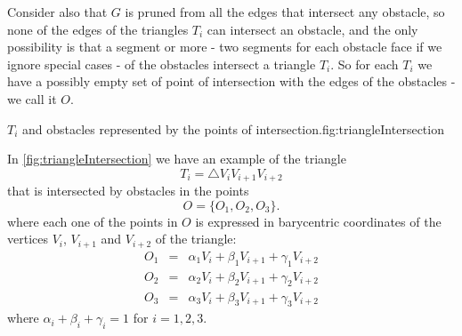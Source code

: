 \documentclass[dissertation.tex]{subfiles}
\begin{document}
Consider also that $G$ is pruned from all the edges that intersect any
obstacle, so none of the edges of the triangles $T_i$ can intersect
an obstacle, and the only possibility is that a segment or more - two
segments for each obstacle face if we ignore special cases - of the
obstacles intersect a
triangle $T_i$. So for each $T_i$ we have a possibly empty set of point
of intersection with the edges of the obstacles - we call it $O$.
\begin{myfig}{$T_i$ and obstacles
    represented by the points of intersection.}{fig:triangleIntersection}
\end{myfig}

In \cref{fig:triangleIntersection} we have an example of the triangle
\begin{equation*}
  T_i = \triangle V_iV_{i+1}V_{i+2} 
\end{equation*}
that is
intersected by obstacles in the points
\begin{equation*}
  O = \{O_1,O_2,O_3\}.
\end{equation*}
where each one of the points in $O$ is expressed in barycentric
coordinates of the vertices $V_i$, $V_{i+1}$ and $V_{i+2}$ of the
triangle:
\begin{eqnarray*}
  O_1&=&\alpha_1 V_i+\beta_1 V_{i+1}+\gamma_1 V_{i+2}\\
  O_2&=&\alpha_2 V_i+\beta_2 V_{i+1}+\gamma_2 V_{i+2}\\
  O_3&=&\alpha_3 V_i+\beta_3 V_{i+1}+\gamma_3 V_{i+2}
\end{eqnarray*}
where $\alpha_i+\beta_i+\gamma_i=1$ for $i=1,2,3$.
\end{document}
